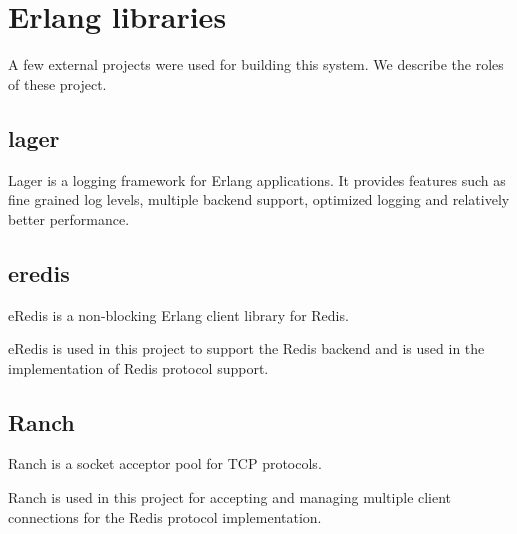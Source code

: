 \section{Erlang libraries}

A few external projects were used for building this system. We describe the
roles of these project.

\subsection{lager}

Lager \citep{lager} is a logging framework for Erlang applications. It provides
features such as fine grained log levels, multiple backend support, optimized
logging and relatively better performance.

\subsection{eredis}

eRedis \citep{eredis} is a non-blocking Erlang client library for Redis.

eRedis is used in this project to support the Redis backend and is used in the
implementation of Redis protocol support.

\subsection{Ranch}

Ranch \citep{ranch} is a socket acceptor pool for TCP protocols.

Ranch is used in this project for accepting and managing multiple client 
connections for the Redis protocol implementation.

